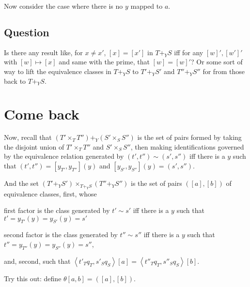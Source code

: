 \documentclass[12pt]{article}
\renewcommand{\(}{\left(}
\renewcommand{\)}{\right)}
\renewcommand{\{}{\left\lbrace}
\renewcommand{\}}{\right\rbrace}
\theoremstyle{remark}
\theoremstyle{definition}
\begin{document}
Now consider the case where there is no $y$ mapped to $a$.  



\subsection{Question}

Is there any result like, for $x \neq x'$, $[x]=[x']$ in $T +_Y S$ iff for any $[w]',[w']'$ with $[w] \mapsto [x]$ and same with the prime, that $[w]=[w]'$? Or some sort of way to lift the equivalence classes in $T +_Y S$ to $T' +_Y S'$ and $T''+_Y S''$ for from those back to $T +_YS$.







\section{Come back}

Now, recall that $(T' \times_T T'') +_Y (S' \times_S S'')$ is the set of pairs formed by taking the disjoint union of $T' \times_T T''$ and $S' \times_S S''$, then making identifications governed by the equivalence relation generated by $(t',t'') \sim (s',s'')$ iff there is a $y$ such that $(t',t'') = [y_{T'},y_{T''}](y)$ and $[y_{S'},y_{S''}](y) = (s',s'')$.  

And the set $(T' +_Y S') \times_{T +_Y S} (T'' +_Y S'')$ is the set of pairs $([a],[b])$ of equivalence classes, first, whose 
\begin{itemize*}
	\item first factor is the class generated by $t' \sim s'$ iff there is a $y$ such that $t' = y_{T'}(y) = y_{S'}(y) = s'$
	\item second factor is the class generated by $t'' \sim s''$ iff there is a $y$ such that $t'' = y_{T''}(y) = y_{S''}(y) = s''$,
\end{itemize*}
and, second, such that $\left\langle t'_{T}q_T,s'_{S}q_S \right\rangle [a]= \left\langle t''_{T}q_T,s''_{S}q_S \right\rangle [b]$.

	
Try this out: define $\theta [a,b] = ([a],[b])$. 
\end{document}
